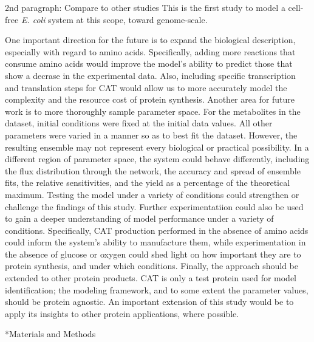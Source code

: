 \documentclass[12pt]{article}
\makeatletter
\renewcommand\section{\@startsection
	{subsection}{2}{0mm}
	{-0.2in}
	{0.05\baselineskip}
	{\normalfont\large\bfseries}}
\makeatother
\begin{document}
2nd paragraph: Compare to other studies
This is the first study to model a cell-free \textit{E. coli} system at this scope, toward genome-scale.

One important direction for the future is to expand the biological description, especially with regard to amino acids.
Specifically, adding more reactions that consume amino acids would improve the model's ability to predict those that show a decrase in the experimental data.
Also, including specific transcription and translation steps for CAT would allow us to more accurately model the complexity and the resource cost of protein synthesis.
Another area for future work is to more thoroughly sample parameter space.
For the metabolites in the dataset, initial conditions were fixed at the initial data values.
All other parameters were varied in a manner so as to best fit the dataset.
However, the resulting ensemble may not represent every biological or practical possibility.
In a different region of parameter space, the system could behave differently, including the flux distribution through the network, the accuracy and spread of ensemble fits, the relative sensitivities, and the yield as a percentage of the theoretical maximum.
Testing the model under a variety of conditions could strengthen or challenge the findings of this study.
Further experimentatiion could also be used to gain a deeper understanding of model performance under a variety of conditions.
Specifically, CAT production performed in the absence of amino acids could inform the system's ability to manufacture them, while experimentation in the absence of glucose or oxygen could shed light on how important they are to protein synthesis, and under which conditions.
Finally, the approach should be extended to other protein products.
CAT is only a test protein used for model identification; the modeling framework, and to some extent the parameter values, should be protein agnostic.
An important extension of this study would be to apply its insights to other protein applications, where possible.

\clearpage

\section*{Materials and Methods}
\end{document}
